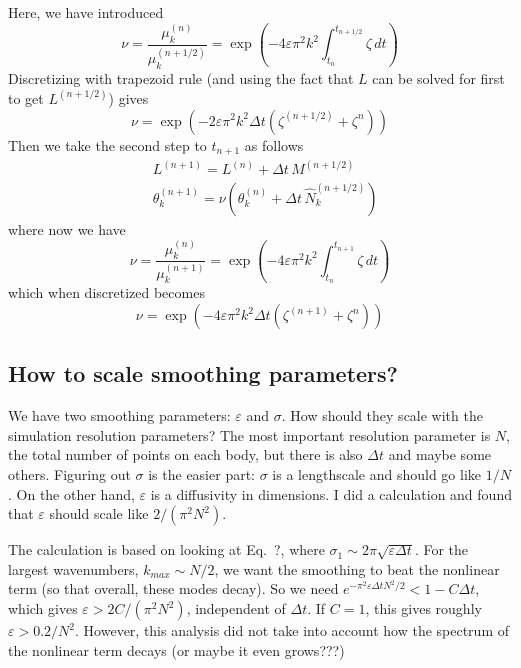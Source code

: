 \documentclass[11pt]{article}
\newcommand{\eps}{\varepsilon}
\newcommand{\elfun}{\zeta}
\newcommand{\dt}{\Delta t}
\begin{document}
Here, we have introduced
\begin{equation}
\nu = \frac{\mu_k^{(n)}}{\mu_k^{(n+1/2)}} = \exp \left( -4 \eps \pi^2 k^2 \int_{t_n}^{t_{n+1/2}} \zeta \, dt \right)
\end{equation}
Discretizing with trapezoid rule (and using the fact that $L$ can be solved for first to get $L^{(n+1/2)}$) gives
\begin{equation}
\nu = \exp \left(-2 \eps \pi^2 k^2 \dt \left( \elfun^{(n+1/2)} + \elfun^{n}\right)\right)
\end{equation}
Then we take the second step to $t_{n+1}$ as follows
\begin{align}
& L^{(n+1)}  = L^{(n)} + \dt \, M^{(n+1/2)} \\
& \theta_k^{(n+1)} = \nu \left( \theta_k^{(n)} + \dt \,  \hat{N}_k^{(n+1/2)} \right)
\end{align}
where now we have
\begin{equation}
\nu = \frac{\mu_k^{(n)}}{\mu_k^{(n+1)}} = \exp \left( -4 \eps \pi^2 k^2 \int_{t_n}^{t_{n+1}} \zeta \, dt \right)
\end{equation}
which when discretized becomes
\begin{equation}
\nu = \exp \left(-4 \eps \pi^2 k^2 \dt \left( \elfun^{(n+1)} + \elfun^{n}\right)\right)
\end{equation}




\subsection{How to scale smoothing parameters?}
We have two smoothing parameters: $\eps$ and $\sigma$. How should they scale with the simulation resolution parameters? The most important resolution parameter is $N$, the total number of points on each body, but there is also $\Delta t$ and maybe some others. Figuring out $\sigma$ is the easier part: $\sigma$ is a lengthscale and should go like $1/N$. On the other hand, $\eps$ is a diffusivity in dimensions. I did a calculation and found that $\eps$ should scale like $2/(\pi^2 N^2)$.

The calculation is based on looking at Eq.~?, where $\sigma_1 \sim 2 \pi \sqrt{\eps \Delta t}$. For the largest wavenumbers, $k_{max} \sim N/2$, we want the smoothing to beat the nonlinear term (so that overall, these modes decay). So we need $e^{-\pi^2 \eps \Delta t N^2 / 2} < 1 - C\Delta t$, which gives $\eps > 2C/(\pi^2 N^2)$, independent of $\Delta t$. If $C=1$, this gives roughly $\eps > 0.2/ N^2$. However, this analysis did not take into account how the spectrum of the nonlinear term decays (or maybe it even grows???)
\end{document}
